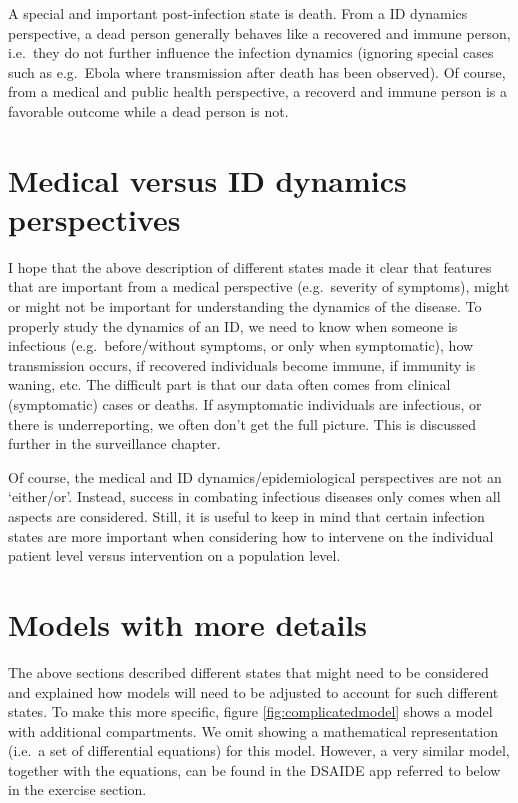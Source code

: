 \documentclass[]{book}
\theoremstyle{definition}
\theoremstyle{definition}
\theoremstyle{definition}
\theoremstyle{remark}
\begin{document}
A special and important post-infection state is death. From a ID
dynamics perspective, a dead person generally behaves like a recovered
and immune person, i.e.~they do not further influence the infection
dynamics (ignoring special cases such as e.g.~Ebola where transmission
after death has been observed). Of course, from a medical and public
health perspective, a recoverd and immune person is a favorable outcome
while a dead person is not.

\section{Medical versus ID dynamics
perspectives}\label{medical-versus-id-dynamics-perspectives}

I hope that the above description of different states made it clear that
features that are important from a medical perspective (e.g.~severity of
symptoms), might or might not be important for understanding the
dynamics of the disease. To properly study the dynamics of an ID, we
need to know when someone is infectious (e.g.~before/without symptoms,
or only when symptomatic), how transmission occurs, if recovered
individuals become immune, if immunity is waning, etc. The difficult
part is that our data often comes from clinical (symptomatic) cases or
deaths. If asymptomatic individuals are infectious, or there is
underreporting, we often don't get the full picture. This is discussed
further in the surveillance chapter.

Of course, the medical and ID dynamics/epidemiological perspectives are
not an `either/or'. Instead, success in combating infectious diseases
only comes when all aspects are considered. Still, it is useful to keep
in mind that certain infection states are more important when
considering how to intervene on the individual patient level versus
intervention on a population level.

\section{Models with more details}\label{models-with-more-details}

The above sections described different states that might need to be
considered and explained how models will need to be adjusted to account
for such different states. To make this more specific, figure
\ref{fig:complicatedmodel} shows a model with additional compartments.
We omit showing a mathematical representation (i.e.~a set of
differential equations) for this model. However, a very similar model,
together with the equations, can be found in the DSAIDE app referred to
below in the exercise section.
\end{document}
